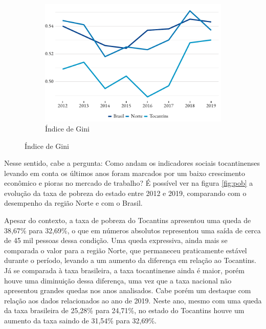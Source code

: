 \begin{figure}[!h]
\begin{subfigure}{\linewidth}
	\end{subfigure}
	\begin{subfigure}{\linewidth}
		\caption{Índice de Gini}
		\label{fig:gini}
		\includegraphics{fig/gini.pdf}
	\end{subfigure}
\end{figure}
\par Nesse sentido, cabe a pergunta: Como andam os indicadores sociais tocantinenses levando em conta os últimos anos foram marcados por um baixo crescimento econômico e pioras no mercado de trabalho? É possível ver na figura \ref{fig:pob} a evolução da taxa de pobreza do estado entre 2012 e 2019, comparando com o desempenho da região Norte e com o Brasil.
\par Apesar do contexto, a taxa de pobreza do Tocantins apresentou uma queda de 38,67\% para 32,69\%, o que em números absolutos representou uma saída de cerca de 45 mil pessoas dessa condição. Uma queda expressiva, ainda mais se comparada o valor para a região Norte, que permaneceu praticamente estável durante o período, levando a um aumento da diferença em relação ao Tocantins. Já se comparada à taxa brasileira, a taxa tocantinense ainda é maior, porém houve uma diminuição dessa diferença, uma vez que a taxa nacional não apresentou grandes quedas nos anos analisados. Cabe porém um destaque com relação aos dados relacionados ao ano de 2019. Neste ano, mesmo com uma queda da taxa brasileira de 25,28\% para 24,71\%, no estado do Tocantins houve um aumento da taxa saindo de 31,54\% para 32,69\%.


